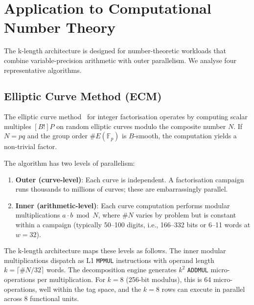 \documentclass[11pt,a4paper]{article}
\begin{document}
\section{Application to Computational Number Theory}
\label{sec:applications}

The k-length architecture is designed for number-theoretic workloads that
combine variable-precision arithmetic with outer parallelism.  We analyse
four representative algorithms.

\subsection{Elliptic Curve Method (ECM)}
\label{sec:ecm}

The elliptic curve method~\cite{lenstra1987} for integer factorisation operates
by computing scalar multiples $[B!]P$ on random elliptic curves modulo the
composite number $N$.  If $N = pq$ and the group order
$\#E(\mathbb{F}_p)$ is $B$-smooth, the computation yields a non-trivial
factor.

The algorithm has two levels of parallelism:

\begin{enumerate}[leftmargin=*]
  \item \textbf{Outer (curve-level)}: Each curve is independent.  A
    factorisation campaign runs thousands to millions of curves; these are
    embarrassingly parallel.

  \item \textbf{Inner (arithmetic-level)}: Each curve computation performs
    modular multiplications $a \cdot b \bmod N$, where $\#N$ varies by
    problem but is constant within a campaign (typically 50--100 digits,
    i.e., 166--332 bits or 6--11 words at $w = 32$).
\end{enumerate}

The k-length architecture maps these levels as follows.  The inner modular
multiplications dispatch as L1 \texttt{MPMUL} instructions with operand
length $k = \lceil \#N / 32 \rceil$ words.  The decomposition engine
generates $k^2$ \texttt{ADDMUL} micro-operations per multiplication.  For
$k = 8$ (256-bit modulus), this is 64 micro-operations, well within the
tag space, and the $k = 8$ rows can execute in parallel across 8 functional
units.
\end{document}
